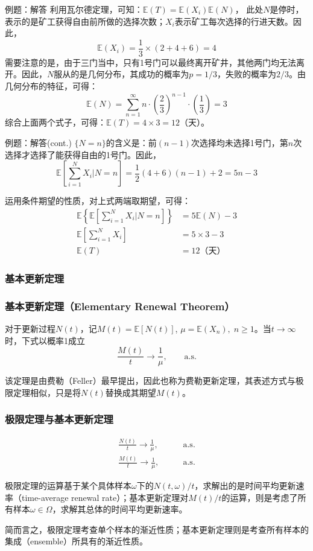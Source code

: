 \documentclass[t]{beamer}
\newcommand{\E}{\mathbb{E}}
\begin{document}
\begin{frame}{例题：解答}
  利用瓦尔德定理，可知：$\E(T)=\E(X_i)\E(N)$，
此处$N$是停时，表示的是矿工获得自由前所做的选择次数；$X_i$表示矿工每次选择的行进天数。因此，
\[\E(X_i)=\frac{1}{3}\times \left(2+4+6\right)=4\]
需要注意的是，由于三门当中，只有1号门可以最终离开矿井，其他两门均无法离开。因此，$N$服从的是几何分布，其成功的概率为$p=1/3$，失败的概率为$2/3$。由几何分布的特征，可得：
\[\E(N)=\sum\limits^{\infty}_{n=1}n\cdot \left(\frac{2}{3}\right)^{n-1}\cdot \left(\frac{1}{3}\right)=3\]
综合上面两个式子，可得：$\E(T)=4\times 3=12$（天）。
\end{frame}

\begin{frame}{例题：解答(cont.)}
  $\{N=n\}$的含义是：前$(n-1)$次选择均未选择1号门，第$n$次选择才选择了能获得自由的1号门。因此，
\[
  \E\left[\sum\limits^N_{i=1}X_i\Big|N=n\right]=\frac{1}{2}\left(4+6\right)(n-1)+2=5n-3
\]

运用条件期望的性质，对上式两端取期望，可得：
\[\begin{split}
  \E\left\{\E\left[\sum\limits^N_{i=1}X_i\Big|N=n\right]\right\}&=5\E(N)-3\\
  \E\left[\sum\limits^N_{i=1}X_i\right]&=5\times 3-3\\
  \E(T)&=12\text{（天）}
\end{split}\]
\end{frame}





\subsubsection{基本更新定理}
\begin{frame}
  \frametitle{基本更新定理（Elementary Renewal Theorem）}

  对于更新过程$N(t)$，记$M(t)=\E[N(t)]$, $\mu=\E(X_n),\; n\ge 1$。当$t\to\infty$时，下式以概率1成立
    \begin{equation*}
        \frac{M(t)}{t}\to\frac{1}{\mu},\qquad \text{a.s.}
    \end{equation*}

    该定理是由费勒（Feller）最早提出，因此也称为费勒更新定理，其表述方式与极限定理相似，只是将$N(t)$替换成其期望$M(t)$。
  \end{frame}


  \begin{frame}
    \frametitle{极限定理与基本更新定理}
  \begin{align}
 \frac{N(t)}{t}\to\frac{1}{\mu},&\qquad \text{a.s.}\tag{极限定理}\\
      \frac{M(t)}{t}\to\frac{1}{\mu},&\qquad \text{a.s.}   \tag{基本更新定理}
  \end{align}


  极限定理的运算基于某个具体样本$\omega$下的$N(t,\omega)/t$，求解出的是时间平均更新速率（time-average renewal rate）；基本更新定理对$M(t)/t$的运算，则是考虑了所有样本$\omega\in\Omega$，求解其总体的时间平均更新速率。
  
  简而言之，极限定理考查单个样本的渐近性质；基本更新定理则是考查所有样本的集成（ensemble）所具有的渐近性质。

\end{frame}
\end{document}
